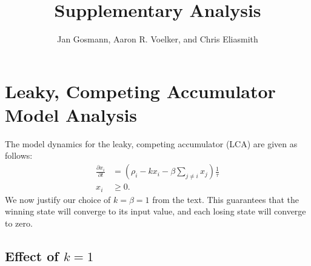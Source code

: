 \documentclass[a4paper]{article}
\title{Supplementary Analysis}
\author{Jan Gosmann, Aaron R. Voelker, and Chris Eliasmith}
\begin{document}
\maketitle


\section{Leaky, Competing Accumulator Model Analysis}

The model dynamics for the leaky, competing accumulator (LCA) are given as follows:
\begin{equation}
    \begin{split}
        \frac{{\partial x}_i}{\partial t} &= \left(\rho_i - kx_i - \beta \sum_{j \neq i} x_j\right) \frac{1}{\tau} \\
        x_i &\ge 0 .
    \end{split}
\end{equation}
We now justify our choice of $k = \beta = 1$ from the text.
This guarantees that the winning state will converge to its input value, and each losing state will converge to zero.

\subsection{Effect of $k = 1$}
\end{document}
